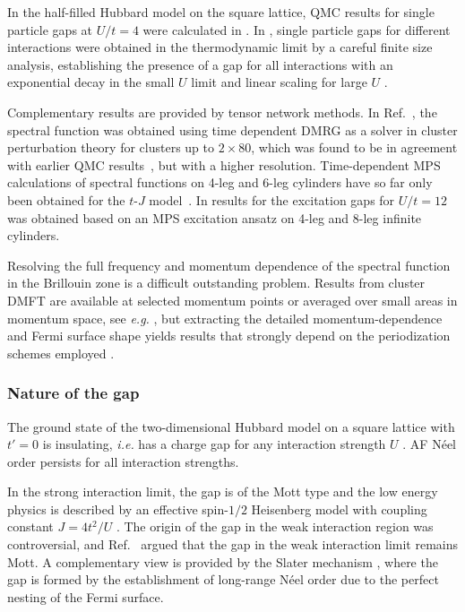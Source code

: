 \documentclass{ar-1col}
\begin{document}
In the half-filled Hubbard model on the square lattice, QMC results for single particle gaps at $U/t\!=\!4$ were calculated in \cite{Furukawa92,Assaad96}. In \cite{Vitali16}, single particle gaps for different interactions were obtained in the thermodynamic limit by a careful finite size analysis, establishing the presence of a gap for all interactions with an exponential decay in the small $U$ limit and linear scaling for large $U$ \cite{Vitali16}.

Complementary results are provided by tensor network methods. In Ref.~\cite{Yang16}, the spectral function was obtained using time dependent DMRG as a solver in cluster perturbation theory for clusters up to $2\times80$, which was found to be in agreement with earlier QMC results~\cite{Bulut94,Preuss95,Preuss97,Grober00}, but with a higher resolution. Time-dependent MPS calculations of spectral functions on 4-leg and 6-leg cylinders have so far only been obtained for the $t$-$J$ model~\cite{Bohrdt20}. In \cite{Damme21} results for the excitation gaps for $U/t=12$ was obtained based on an MPS excitation ansatz on 4-leg and 8-leg infinite cylinders.

\begin{marginnote}
\end{marginnote}

Resolving the full frequency and momentum dependence of the spectral function in the Brillouin zone is a difficult outstanding problem. Results from cluster DMFT are available at selected momentum points or averaged over small areas in momentum space, see {\it e.g.}
    \cite{Lin10}, but extracting the detailed momentum-dependence and Fermi surface shape yields results that strongly depend on the periodization schemes employed \cite{Klett20}.


\subsubsection{Nature of the gap}
\label{sec:gap}
The ground state of the two-dimensional Hubbard model on a square lattice with $t'\!=\!0$ is insulating, {\it i.e.} has a charge gap for any interaction strength $U$ \cite{Hirsch85,White89,Schafer15,Vitali16,Simkovic20}.
AF N\'{e}el order \cite{Hirsch89,Varney09} persists for all interaction strengths.

In the strong interaction limit, the gap is of the Mott type \cite{Mott49} and the low energy physics is described by an effective
spin-$1/2$ Heisenberg model with coupling constant $J = 4t^2/U$ \cite{Anderson59}.
The origin of the gap in the weak interaction region was controversial, and
Ref.~\cite{Anderson97} argued that the gap in the weak interaction limit remains Mott.
A complementary view is provided by the Slater mechanism \cite{Slater51}, where
the gap is formed by the establishment of long-range N\'{e}el order due to the perfect nesting of the Fermi surface. 
\end{document}
